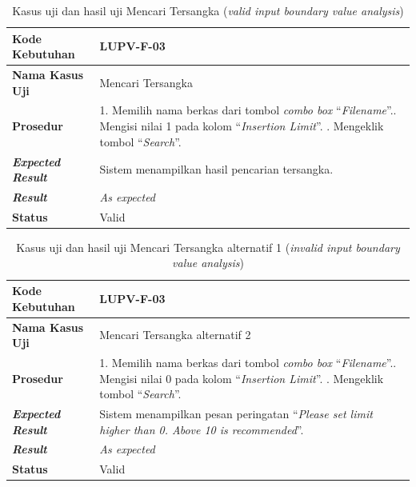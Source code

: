 \begin{longtable}{|L{3cm}|L{9cm}|}
  \caption{Kasus uji dan hasil uji Mencari Tersangka (\emph{valid input boundary
  value analysis})}\label{tab:search-suspect-bva-1} \\
  \hline
  \textbf{Kode Kebutuhan} & LUPV-F-03 \\\hline
  \textbf{Nama Kasus Uji} & Mencari Tersangka\\\hline
  \textbf{Prosedur} & 1. Memilih nama berkas dari tombol \emph{combo box}
                      ``\emph{Filename}''.. Mengisi nilai 1 pada kolom ``\emph{Insertion
                      Limit}''. . Mengeklik tombol ``\emph{Search}''.\\\hline
  \textbf{\emph{Expected Result}} & Sistem menampilkan hasil pencarian tersangka.\\\hline
  \textbf{\emph{Result}} & \emph{As expected} \\\hline
  \textbf{Status} & Valid\\\hline
\end{longtable}

\begin{longtable}{|L{3cm}|L{9cm}|}
  \caption{Kasus uji dan hasil uji Mencari Tersangka alternatif 1
  (\emph{invalid input boundary value analysis})}\label{tab:search-suspect-bva-2} \\
  \hline
  \textbf{Kode Kebutuhan} & LUPV-F-03 \\\hline
  \textbf{Nama Kasus Uji} & Mencari Tersangka alternatif 2\\\hline
  \textbf{Prosedur} & 1. Memilih nama berkas dari tombol \emph{combo box}
                      ``\emph{Filename}''.. Mengisi nilai 0 pada kolom ``\emph{Insertion
                      Limit}''. . Mengeklik tombol ``\emph{Search}''.\\\hline

  \textbf{\emph{Expected Result}} & Sistem menampilkan pesan peringatan ``\emph{Please set limit
                                    higher than 0. Above 10 is recommended}''.\\\hline
  \textbf{\emph{Result}} & \emph{As expected} \\\hline
  \textbf{Status} & Valid\\\hline
\end{longtable}

